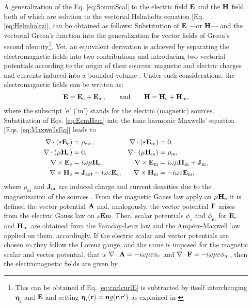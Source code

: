 A generalization of the Eq. \eqref{eq:SommScal} to the electric field $\vb{E}$ and the $\vb{H}$ field, both of which are solution to the vectorial Helmholtz equation [Eq. \eqref{eq:Helmholtz}], can be obtained as follows: Substitution of  $\vb{E}$ ---or $\vb{H}$--- and the vectorial Green's function into the generalization for vector fields of Green's second identity\footnote{This can be obtained if  Eq. \eqref{eq:curlcurlE} is subtracted by itself interchanging $\boldsymbol{\eta}_j $ and $\vb{E}$ and setting $\boldsymbol{\eta}_i(\vb{r}) = \vb{n}g(\vb{r}|\vb{r}')$ as explained in \cite{zangwill_modern_2013}}. Yet, an equivalent derivation is achieved by separating the electromagnetic fields into two contributions and introducing  two vectorial potentials according to the origin of their sources: magnetic and electric  charges and currents induced into a bounded volume \cite{jin_theory_2010,bondeson_computational_2005}. Under such considerations, the electromagnetic fields can be written as:
%
\begin{align}
\vb{E} = \vb{E}_\text{e} + \vb{E}_\text{m},
    \qquad
    \text{and}
    \qquad
\vb{H} = \vb{H}_\text{e} + \vb{H}_\text{m},
\label{eq:EemHem}
\end{align}
%
where the subscript 'e' ('m') stands for the electric (magnetic) sources. Substitution of Eqs. \eqref{eq:EemHem} into the time harmonic Maxwells' equation [Eqs. \eqref{eq:MaxwellsEq}] leads to
%
\begin{subequations}
    \label{eq:MaxwellsEq}
\begin{align}
    \nabla \cdot \qty(\varepsilon \vb{E}_\text{e})  &= \rho_\text{ext},
                    &\nabla \cdot \qty(\varepsilon \vb{E}_\text{m})  &= 0,\\
    \nabla \cdot  (\mu\vb{H}_\text{e})  &= 0,
                    & \nabla \cdot  (\mu\vb{H}_\text{m})  &= \rho_\text{m},\\
    \nabla \times \vb{E}_\text{e}  &= i\omega \mu \vb{H}_\text{e},
                    & \nabla \times \vb{E}_\text{m}  &= i\omega \mu \vb{H}_\text{m} + \vb{J}_\text{m},\\
    \nabla \times \vb{H}_\text{e}  &= \vb{J}_\text{ext} - i\omega \varepsilon \vb{E}_\text{e},
                & \nabla \times \vb{H}_\text{m}  &=- i\omega \varepsilon \vb{E}_\text{m},
\end{align}
\end{subequations}
where $\rho_\text{m}$ and $\vb{J}_\text{m}$ are  induced charge and current densities due to the magnetization of the sources \cite{jin_theory_2010}. From the magnetic Gauss law apply on $\mu\vb{H}_\text{e}$ it is defined the vector potential $\vb{A}$ and, analogously, the vector potential $\vb{F}$ arises from the electric Gauss law on $\varepsilon\vb{E}\text{m}$. Then, scalar potentials $\phi_\text{e}$ and $\phi_\text{m}$ for $\vb{E}_\text{e} $ and $\vb{H}_\text{m}$ are obtained from the Faraday-Lenz law and the Ampère-Maxwell law applied on them, accordingly. If the electric scalar and vector potentials are chosen so they follow the Lorenz gauge, and the same is imposed for the magnetic scalar and vector potential, that is $\nabla\cdot\vb{A} = -i\omega\mu\varepsilon \phi_\text{e}$ and $\nabla\cdot\vb{F} = -i\omega\mu\varepsilon \phi_\text{m}$, then the electromagnetic fields are given by
